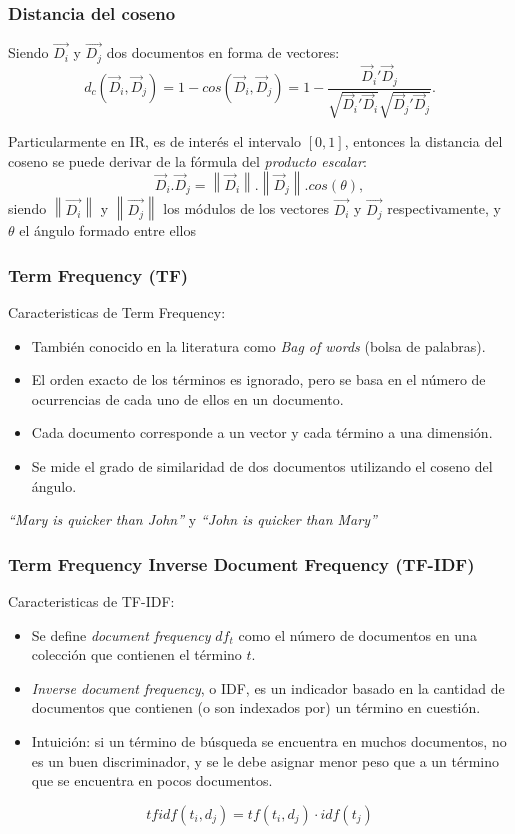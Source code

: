 \begin{frame}
	\frametitle{Distancia del coseno}
	Siendo \(\overrightarrow{D_i}\) y \(\overrightarrow{D_j}\) dos documentos en forma de vectores:
	\[d_c(\vec{D}_i, \vec{D}_j) = 1 - cos(\vec{D}_i, \vec{D}_j) = 1 - \frac{{\vec{D}_i}'\vec{D}_j}{\sqrt{{\vec{D}_i}'\vec{D}_i}\sqrt{{\vec{D}_j}'\vec{D}_j}}.\]

	\bigskip
	Particularmente en IR, es de interés el intervalo \([0, 1]\), entonces la distancia del coseno se puede derivar de la fórmula del \textit{producto escalar}:
	\[\vec{D}_i.\vec{D}_j = \left \| \vec{D}_i \right \|.\left \| \vec{D}_j \right \|.cos(\theta),\]
	siendo \(\left \|\overrightarrow{D_i}\right \|\) y \(\left \|\overrightarrow{D_j}\right \|\) los módulos de los vectores \(\overrightarrow{D_i}\) y \(\overrightarrow{D_j}\) respectivamente, y $\theta$ el ángulo formado entre ellos
\end{frame}

\begin{frame}
	\frametitle{Term Frequency (TF)}
	Caracteristicas de Term Frequency:
	\bigskip
	\begin{itemize}[<*>]
		\item También conocido en la literatura como \textit{Bag of words} (bolsa de palabras).
		\item El orden exacto de los términos es ignorado, pero se basa en el número de ocurrencias de cada uno de ellos en un documento.
		\item Cada documento corresponde a un vector y cada término a una dimensión.
		\item Se mide el grado de similaridad de dos documentos utilizando el coseno del ángulo.
	\end{itemize}

	\bigskip
	\centering
	\textit{“Mary is quicker than John”} y \textit{“John is quicker than Mary”}
\end{frame}

\begin{frame}
	\frametitle{Term Frequency Inverse Document Frequency (TF-IDF)}
	Caracteristicas de TF-IDF:
	\bigskip
	\begin{itemize}[<*>]
		\item Se define \textit{document frequency} \(df_t\) como el número de documentos en una colección que contienen el término \(t\).
		\item \textit{Inverse document frequency}, o IDF, es un indicador basado en la cantidad de documentos que contienen (o son indexados por) un término en cuestión.
		\item Intuición: si un término de búsqueda se encuentra en muchos documentos, no es un buen discriminador, y se le debe asignar menor peso que a un término que se encuentra en pocos documentos.
	\end{itemize}

	\centering
	\[tfidf(t_i, d_j) = tf(t_i, d_j) \cdot idf(t_j)\]
\end{frame}

